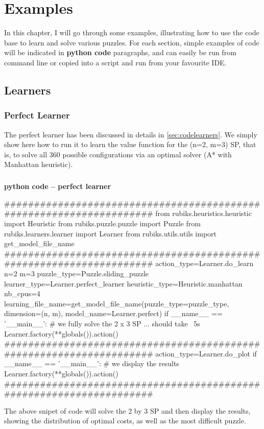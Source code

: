 
\chapter{Examples} %

\label{sec:Examples} %


In this chapter, I will go through some examples, illustrating how to use the code base to learn and solve various puzzles. For each section, simple examples of code will be indicated in \afblue \textbf{python code} \black paragraphs, and can easily be run from command line or copied into a script and run from your favourite IDE.


\section{Learners}


\subsection{Perfect Learner}
\label{PLSS}

The perfect learner has been discussed in details in \ref{sec:codelearners}. We simply show here how to run it to learn the value function for the (n=2, m=3) SP, that is, to solve all 360 possible configurations via an optimal solver (A{*} with Manhattan heuristic).


\afblue
\paragraph{}{\textbf{python code -- perfect learner}}
\begin{python}
####################################################################
from rubiks.heuristics.heuristic import Heuristic
from rubiks.puzzle.puzzle import Puzzle
from rubiks.learners.learner import Learner
from rubiks.utils.utils import get_model_file_name
####################################################################
action_type=Learner.do_learn
n=2
m=3
puzzle_type=Puzzle.sliding_puzzle
learner_type=Learner.perfect_learner
heuristic_type=Heuristic.manhattan
nb_cpus=4
learning_file_name=get_model_file_name(puzzle_type=puzzle_type,
                                       dimension=(n, m),
                                       model_name=Learner.perfect)
if __name__ == '__main__':
    # we fully solve the 2 x 3 SP ... should take ~5s
    Learner.factory(**globals()).action()
####################################################################
action_type=Learner.do_plot
if __name__ == '__main__':
    # we display the results
    Learner.factory(**globals()).action()
####################################################################
\end{python}
\black
The above snipet of code will solve the 2 by 3 SP and then display the results, showing the distribution of optimal costs, as well as the most difficult puzzle.

